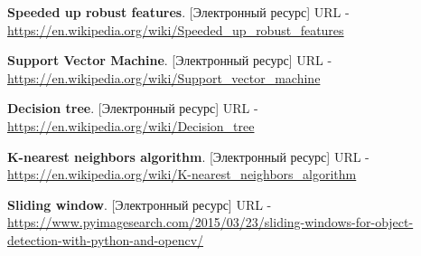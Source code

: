 \begin{thebibliography}{2}
	\textbf{Speeded up robust features}. [Электронный ресурс] URL - 
	\href{https://en.wikipedia.org/wiki/Speeded\_up_robust\_features}{https://en.wikipedia.org/wiki/Speeded\_up\_robust\_features}
	
	\textbf{Support Vector Machine}. [Электронный ресурс] URL - 
	\href{https://en.wikipedia.org/wiki/Support\_vector\_machine}{https://en.wikipedia.org/wiki/Support\_vector\_machine}
	
	\textbf{Decision tree}. [Электронный ресурс] URL - 
	\href{https://en.wikipedia.org/wiki/Decision\_tree}{https://en.wikipedia.org/wiki/Decision\_tree}
	
	\textbf{K-nearest neighbors algorithm}. [Электронный ресурс] URL - 
	\href{https://en.wikipedia.org/wiki/K-nearest\_neighbors\_algorithm}{https://en.wikipedia.org/wiki/K-nearest\_neighbors\_algorithm}
	
	\textbf{Sliding window}. [Электронный ресурс] URL - 
	\href{https://www.pyimagesearch.com/2015/03/23/sliding-windows-for-object-detection-with-python-and-opencv/}{https://www.pyimagesearch.com/2015/03/23/sliding-windows-for-object-detection-with-python-and-opencv/}
	
\end{thebibliography}		  		 		